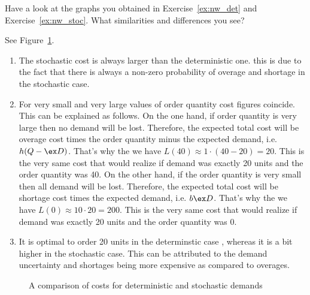 \begin{question}
Have a look at the graphs you obtained in Exercise~\ref{ex:nw_det} and Exercise~\ref{ex:nw_stoc}. What similarities and differences you see?
\end{question}

\begin{solution}
See Figure~\ref{fig:LQ_comparison}. 

\begin{enumerate}
\item The stochastic cost is always larger than the deterministic one. this is due to the fact that there is always a non-zero probability of overage and shortage in the stochastic case. 
\item For very small and very large values of order quantity cost figures coincide. This can be explained as follows. On the one hand, if order quantity is very large then no demand will be lost. Therefore, the expected total cost will be overage cost times the order quantity minus the expected demand, i.e. $h(Q-\ex D)$. That's why the we have $L(40)\approx 1\cdot(40-20)=20$. This is the very same cost that would realize if demand was exactly 20 units and the order quantity was 40. On the other hand, if the order quantity is very small then all demand will be lost. Therefore, the expected total cost will be shortage cost times the expected demand, i.e. $b \ex D$. That's why the we have $L(0)\approx 10\cdot20=200$. This is the very same cost that would realize if demand was exactly 20 units and the order quantity was 0.
\item It is optimal to order 20 units in the determinstic case , whereas it is a bit higher in the stochastic case. This can be attributed to the demand uncertainty and shortages being more expensive as compared to overages. 
\end{enumerate}


\begin{figure}[htbp]
\centering
{}
\caption{A comparison of costs for deterministic and stochastic demands}
\label{fig:LQ_comparison}
\end{figure}
\end{solution}


